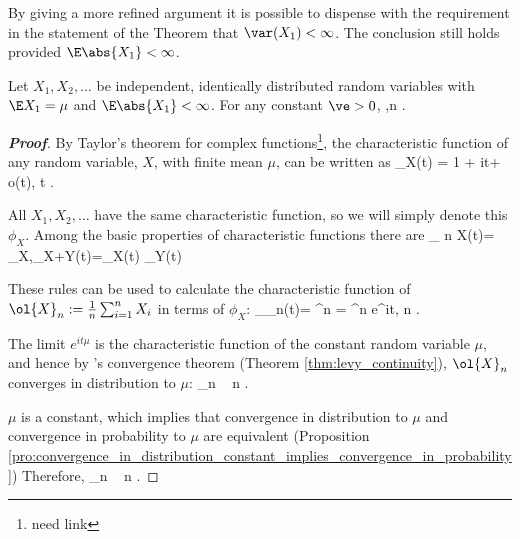 By giving a more refined argument it is possible to dispense with the requirement in the statement of the Theorem that $\var (X_1) < \infty$. The conclusion still holds provided $\E \abs{X_1} < \infty$.

\begin{theorem}\label{thm:wlln_finite_absolute_moment}
Let $X_1,X_2, \dots$ be independent, identically distributed random variables with $\E X_1 = \mu$ and $\E\abs{X_1} < \infty$. For any constant $\ve > 0$,
\be
\pro{} ,\quad {}n \to \infty.
\ee
\end{theorem}


\begin{proof}[\bf Proof]%
By Taylor's theorem for complex functions\footnote{need link}, the characteristic function of any random variable, $X$, with finite mean $\mu$, can be written as
\be
\phi_X(t) = 1 + it\mu + o(t), \quad t .
\ee

All $X_1, X_2, \dots$ have the same characteristic function, so we will simply denote this $\phi_X$. Among the basic properties of characteristic functions there are
\be
\phi_{ n X}(t)= \phi_X,\quad \phi_{X+Y}(t)=\phi_X(t) \phi_Y(t) \quad {}
\ee

These rules can be used to calculate the characteristic function of $\ol{X}_n := \frac 1n\sum^n_{i=1}X_i$ in terms of $\phi_X$:
\be
\phi_{_n}(t)= ^n = ^n \to e^{it\mu}, \quad {} n \to \infty.
\ee

The limit  $e^{it\mu}$  is the characteristic function of the constant random variable $\mu$, and hence by \levy's convergence theorem (Theorem \ref{thm:levy_continuity}), $\ol{X}_n$ converges in distribution to $\mu$:
\be
{}_n  \mu\  n \to \infty.
\ee

$\mu$ is a constant, which implies that convergence in distribution to $\mu$ and convergence in probability to $\mu$ are equivalent (Proposition \ref{pro:convergence_in_distribution_constant_implies_convergence_in_probability}) Therefore,
\be
{}_n   \mu\  n \to \infty.
\ee%
\end{proof}%


